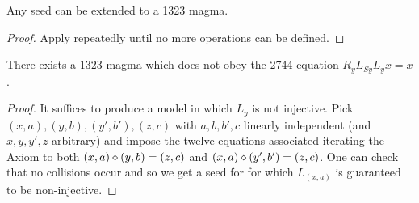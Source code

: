 \begin{corollary}\label{create-1323} Any seed can be extended to a 1323 magma.
\end{corollary}

\begin{proof}  Apply  repeatedly until no more operations can be defined.
\end{proof}

\begin{corollary}\label{1323-refute-2744}  There exists a 1323 magma which does not obey the 2744 equation $R_y L_{Sy} L_y x = x$.
\end{corollary}

\begin{proof} It suffices to produce a model in which $L_y$ is not injective. Pick $(x,a), (y,b), (y',b'), (z,c)$ with $a,b,b',c$ linearly independent (and $x,y,y',z$ arbitrary) and impose the twelve equations associated iterating the Axiom to both $(x,a) \diamond (y,b) = (z,c)$ and $(x,a) \diamond (y',b') = (z,c)$.  One can check that no collisions occur and so we get a seed for  for which $L_{(x,a)}$ is guaranteed to be non-injective.
\end{proof}
